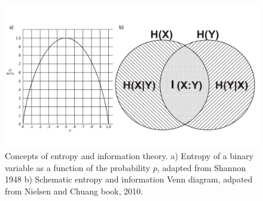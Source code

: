 \begin{figure}
    \centering
    \includegraphics[width=\textwidth]{Figures/Chapter1/intro_fig_info.pdf}
    \caption{Concepts of entropy and information theory. a) Entropy of a binary variable as a function of the probability $p$, adapted from Shannon 1948 b) Schematic entropy and information Venn diagram, adpated from Nielsen and Chuang book, 2010.}
    \label{fig:chap1:info_theory_concepts}
\end{figure}

